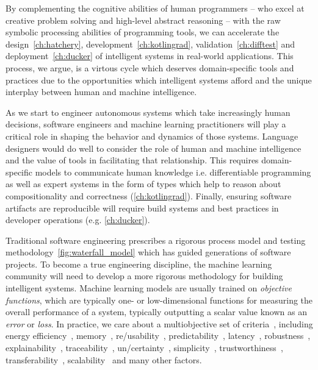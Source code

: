 By complementing the cognitive abilities of human programmers -- who excel at creative problem solving and high-level abstract reasoning -- with the raw symbolic processing abilities of programming tools, we can accelerate the design~\autoref{ch:hatchery}, development~\autoref{ch:kotlingrad}, validation~\autoref{ch:difftest} and deployment~\autoref{ch:ducker} of intelligent systems in real-world applications. This process, we argue, is a virtous cycle which deserves domain-specific tools and practices due to the opportunities which intelligent systems afford and the unique interplay between human and machine intelligence.

As we start to engineer autonomous systems which take increasingly human decisions, software engineers and machine learning practitioners will play a critical role in shaping the behavior and dynamics of those systems. Language designers would do well to consider the role of human and machine intelligence and the value of tools in facilitating that relationship. This requires domain-specific models to communicate human knowledge i.e. differentiable programming as well as expert systems in the form of types which help to reason about compositionality and correctness (\autoref{ch:kotlingrad}). Finally, ensuring software artifacts are reproducible will require build systems and best practices in developer operations (e.g. \autoref{ch:ducker}).

Traditional software engineering prescribes a rigorous process model and testing methodology~\autoref{fig:waterfall_model} which has guided generations of software projects. To become a true engineering discipline, the machine learning community will need to develop a more rigorous methodology for building intelligent systems. Machine learning models are usually trained on \textit{objective functions}, which are typically one- or low-dimensional functions for measuring the overall performance of a system, typically outputting a scalar value known as an \textit{error} or \textit{loss}. In practice, we care about a multiobjective set of criteria~\citep{censi2015mathematical}, including energy efficiency~\citep{paull2010novel}, memory~\citep{memory2013mitliagkas}, re/usability~\citep{breuleux2017automatic,deleu2019torchmeta}, predictability~\citep{turner2017well}, latency~\citep{ravanelli2018twin}, robustness~\citep{pineau2003policy}, explainability~\citep{turner2016model}, traceability~\citep{guo2017semantically, tsirigotis2018orion}, un/certainty~\citep{diaz2018interactive}, simplicity~\citep{kastner2019representation}, trustworthiness~\citep{xu2017efficient}, transferability~\citep{mehta2019active}, scalability~\citep{luan2019break} and many other factors.


